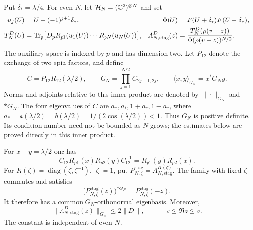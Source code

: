 Put $\delta_*=\lambda/4$. For even $N$, let
$\mathcal H_N=(\mathbb C^2)^{\otimes N}$ and set
\begin{align}
 u_j(U)&=U+(-1)^{j+1}\delta_*,
 &\Phi(U)&=F(U+\delta_*)F(U-\delta_*),\label{physical:stagger-arguments}\\
 T_N^D(U)&=\operatorname{Tr}_p\bigl[D_pR_{p1}(u_1(U))\cdots R_{pN}(u_N(U))\bigr],
 &A_{N,\mathrm{stag}}^D(z)&=
 \frac{T_N^D(\rho(v-z))}{\Phi(\rho(v-z))^{N/2}}.
 \label{physical:staggered-transfer-definition}
\end{align}
The auxiliary space is indexed by $p$ and has dimension two. Let $P_{12}$
denote the exchange of two spin factors, and define
\begin{equation}\label{physical:metric}
 C=P_{12}R_{12}(\lambda/2),\qquad
 G_N=\prod_{j=1}^{N/2}C_{2j-1,2j},\qquad
 \langle x,y\rangle_{G_N}=x^*G_Ny.
\end{equation}
Norms and adjoints relative to this inner product are denoted by
$\|\cdot\|_{G_N}$ and $*G_N$. The four eigenvalues of $C$ are
$a_*,a_*,1+a_*,1-a_*$, where
$a_*=a(\lambda/2)=b(\lambda/2)=1/(2\cos(\lambda/2))<1$.
Thus $G_N$ is positive definite. Its condition number need not be bounded
as $N$ grows; the estimates below are proved directly in this inner product.

\begin{lemma}
\label{physical:exchange-adjoint}
For $x-y=\lambda/2$ one has
\begin{equation}\label{physical:pair-exchange}
 C_{12}R_{p1}(x)R_{p2}(y)C_{12}^{-1}
   =R_{p1}(y)R_{p2}(x).
\end{equation}
For $K(\zeta)=\operatorname{diag}(\zeta,\zeta^{-1})$, $|\zeta|=1$, put
$P_{N,\zeta}^{\mathrm{stag}}=A_{N,\mathrm{stag}}^{K(\zeta)}$.
The family with fixed $\zeta$ commutes and satisfies
\begin{equation}\label{physical:row-adjoint}
 \bigl(P_{N,\zeta}^{\mathrm{stag}}(z)\bigr)^{*G_N}
       =P_{N,\zeta}^{\mathrm{stag}}(-\overline z).
\end{equation}
It therefore has a common $G_N$-orthonormal eigenbasis. Moreover,
\begin{equation}\label{physical:uniform-strip-bound}
 \|A_{N,\mathrm{stag}}^D(z)\|_{G_N}\le 2\|D\|,
 \qquad -v\le\Re z\le v.
\end{equation}
The constant is independent of even $N$.
\end{lemma}

